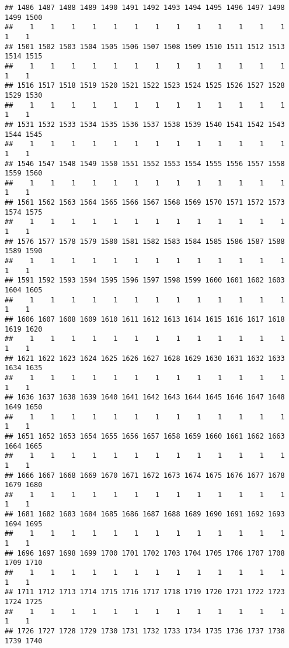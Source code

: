 \documentclass[]{article}
\begin{document}
\begin{verbatim}
## 1486 1487 1488 1489 1490 1491 1492 1493 1494 1495 1496 1497 1498 1499 1500 
##    1    1    1    1    1    1    1    1    1    1    1    1    1    1    1 
## 1501 1502 1503 1504 1505 1506 1507 1508 1509 1510 1511 1512 1513 1514 1515 
##    1    1    1    1    1    1    1    1    1    1    1    1    1    1    1 
## 1516 1517 1518 1519 1520 1521 1522 1523 1524 1525 1526 1527 1528 1529 1530 
##    1    1    1    1    1    1    1    1    1    1    1    1    1    1    1 
## 1531 1532 1533 1534 1535 1536 1537 1538 1539 1540 1541 1542 1543 1544 1545 
##    1    1    1    1    1    1    1    1    1    1    1    1    1    1    1 
## 1546 1547 1548 1549 1550 1551 1552 1553 1554 1555 1556 1557 1558 1559 1560 
##    1    1    1    1    1    1    1    1    1    1    1    1    1    1    1 
## 1561 1562 1563 1564 1565 1566 1567 1568 1569 1570 1571 1572 1573 1574 1575 
##    1    1    1    1    1    1    1    1    1    1    1    1    1    1    1 
## 1576 1577 1578 1579 1580 1581 1582 1583 1584 1585 1586 1587 1588 1589 1590 
##    1    1    1    1    1    1    1    1    1    1    1    1    1    1    1 
## 1591 1592 1593 1594 1595 1596 1597 1598 1599 1600 1601 1602 1603 1604 1605 
##    1    1    1    1    1    1    1    1    1    1    1    1    1    1    1 
## 1606 1607 1608 1609 1610 1611 1612 1613 1614 1615 1616 1617 1618 1619 1620 
##    1    1    1    1    1    1    1    1    1    1    1    1    1    1    1 
## 1621 1622 1623 1624 1625 1626 1627 1628 1629 1630 1631 1632 1633 1634 1635 
##    1    1    1    1    1    1    1    1    1    1    1    1    1    1    1 
## 1636 1637 1638 1639 1640 1641 1642 1643 1644 1645 1646 1647 1648 1649 1650 
##    1    1    1    1    1    1    1    1    1    1    1    1    1    1    1 
## 1651 1652 1653 1654 1655 1656 1657 1658 1659 1660 1661 1662 1663 1664 1665 
##    1    1    1    1    1    1    1    1    1    1    1    1    1    1    1 
## 1666 1667 1668 1669 1670 1671 1672 1673 1674 1675 1676 1677 1678 1679 1680 
##    1    1    1    1    1    1    1    1    1    1    1    1    1    1    1 
## 1681 1682 1683 1684 1685 1686 1687 1688 1689 1690 1691 1692 1693 1694 1695 
##    1    1    1    1    1    1    1    1    1    1    1    1    1    1    1 
## 1696 1697 1698 1699 1700 1701 1702 1703 1704 1705 1706 1707 1708 1709 1710 
##    1    1    1    1    1    1    1    1    1    1    1    1    1    1    1 
## 1711 1712 1713 1714 1715 1716 1717 1718 1719 1720 1721 1722 1723 1724 1725 
##    1    1    1    1    1    1    1    1    1    1    1    1    1    1    1 
## 1726 1727 1728 1729 1730 1731 1732 1733 1734 1735 1736 1737 1738 1739 1740 

\end{verbatim}
\end{document}

